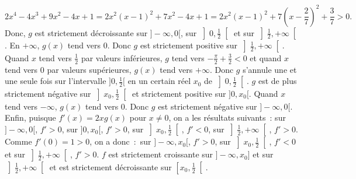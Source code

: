 {\begin{enumerate}
{$$2x^4-4x^3+9x^2-4x+1=2x^2(x-1)^2+7x^2-4x+1=2x^2(x-1)^2+7\left(x-\frac{2}{7}\right)^2+\frac{3}{7}>0.$$
Donc, $g$ est
strictement décroissante sur $]-\infty,0[$, sur $\left]0,\frac{1}{2}\right[$ et sur $\left]\frac{1}{2},+\infty\right[$. En $+\infty$, $g(x)$
tend vers $0$. Donc $g$ est strictement positive sur $\left]\frac{1}{2},+\infty\right[$. Quand $x$ tend vers $\frac{1}{2}$ par
valeurs inférieures, $g$ tend vers $-\frac{\pi}{2}+\frac{3}{2}<0$ et quand $x$ tend vers $0$ par valeurs
supérieures, $g(x)$ tend vers $+\infty$. Donc $g$ s'annule une et une seule fois sur l'intervalle $]0,\frac{1}{2}[$ en
un certain réel $x_0$ de $\left]0,\frac{1}{2}\right[$. $g$ est de plus strictement négative sur $\left]x_0,\frac{1}{2}\right[$ 
et strictement positive sur $]0,x_0[$. Quand $x$ tend vers $-\infty$, $g(x)$ tend vers $0$. Donc $g$ est strictement
négative sur $]-\infty,0[$. Enfin, puisque $f'(x)=2xg(x)$ pour $x\neq0$, on a les résultats suivants~:
sur
$]-\infty,0[$, $f'> 0$, sur $]0,x_0[$, $f'> 0$, sur $\left]x_0,\frac{1}{2}\right[$, $f'< 0$, sur $\left]\frac{1}{2},+\infty\right[$, $f'>
0$. Comme $f'(0)=1>0$, on a donc~:~sur $]-\infty,x_0[$, $f'>0$,
sur $\left]x_0,\frac{1}{2}\right[$, $f'< 0$ et sur $\left]\frac{1}{2},+\infty\right[$, $f'> 0$. $f$ est strictement croissante sur
$]-\infty,x_0]$ et sur $\left]\frac{1}{2},+\infty\right[$ et est strictement décroissante sur $\left[x_0,\frac{1}{2}\right[$.
}
\end{enumerate}
}
